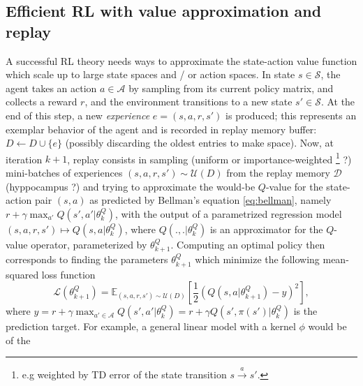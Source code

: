 \documentclass[10pt,letterpaper]{article}
\begin{document}
\subsection{Efficient RL with value approximation and replay}
A successful RL theory needs ways to approximate the state-action value function
which scale up to large state spaces and / or action spaces.
In state $s \in \mathcal S$, the agent takes an action $a \in \mathcal A$
by sampling from its current policy matrix, and collects a reward $r$,
and the environment transitions to a new state $s' \in \mathcal S$. At the end of
this step, a new \textit{experience} $e = (s,a,r,s')$ is produced; this represents an exemplar
behavior of the agent and is recorded in replay memory buffer:
$D \leftarrow D \cup \{e\}$ (possibly discarding the oldest entries to make space).
Now, at iteration $k+1$, replay consists in sampling (uniform or importance-weighted
\footnote{e.g weighted by TD error of the state transition $s \overset{a}{\rightarrow} s'$.} ?)  mini-batches of experiences
$(s, a, r, s') \sim \mathcal U(D)$ from the replay memory $\mathcal D$ (hyppocampus ?)
and trying to approximate
the would-be $Q$-value for the state-action pair $(s,a)$ as predicted by Bellman's equation \eqref{eq:bellman}, namely
$r + \gamma \max_{a'} Q(s', a'|\theta^Q_k)$, with the output of a parametrized regression model $(s,a,r,s')
\mapsto {Q}(s, a|\theta^Q_{k})$, where $Q(.,.|\theta^Q_{k})$ is an approximator for the $Q$-value operator,  parameterized by $\theta^Q_{k+1}$.
Computing an optimal policy then corresponds to finding the parameters $\theta^Q_{k+1}$ which minimize the following mean-squared loss function
\begin{equation}
  \mathcal L(\theta^Q_{k+1})
  = \mathbb E_{(s, a, r, s') \sim \mathcal U(D)}\left[\frac{1}{2}(Q(s, a|\theta^Q_{k+1}) - y)^2\right],
  \label{eq:oracle}
\end{equation}
where
$ y = r + \gamma \max_{a' \in \mathcal A} Q(s', a'|\theta^Q_k) = r + \gamma Q(s', \pi(s')|\theta^Q_k)$ is the prediction target.
For example, a general linear model with a kernel $\phi$ would be of the
\end{document}
